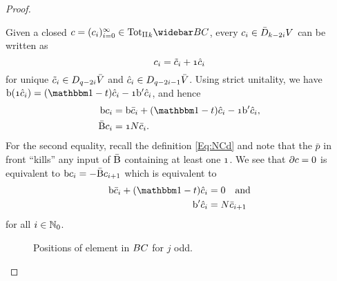 \documentclass[\MainFolder/Text.tex]{subfiles}
\begin{document}
\begin{proof}
\begin{ProofList}
Given a closed $c = (c_i)_{i=0}^\infty \in \TotII_k \NConCycBi$, every $c_i \in \bar{D}_{k-2i} V$ can be written as 
$$ c_i = \tilde{c}_i + \NOne \hat{c}_i $$
for unique $\tilde{c}_i\in D_{q-2i} \bar{V}$ and $\hat{c}_i \in D_{q-2i-1} \bar{V}$. Using strict unitality, we have $\Hd(\NOne\hat{c}_i) = (\Id-\CycPermOp)\hat{c}_i - \NOne \Hd'\hat{c}_i$, and hence
\begin{align*}
   \Hd c_i &=  \Hd\bar{c}_i + (\Id-\CycPermOp)\hat{c}_i - \NOne \Hd'\hat{c}_i, \\
   \NCd c_i &= \NOne \CountOp \bar{c}_i.
\end{align*}
For the second equality, recall the definition \eqref{Eq:NCd} and note that the $\bar{p}$ in front ``kills'' any input of $\bar{\mathrm{B}}$ containing at least one $\NOne$. We see that $\partial c = 0$ is equivalent to $\mathrm{b} c_i = - \bar{\mathrm{B}} c_{i+1}$ which is equivalent to
$$ \begin{aligned}
\Hd \bar{c}_i + (\Id-\CycPermOp)\hat{c}_i & = 0\quad\text{and}  \\
\Hd'\hat{c}_i &= \CountOp \bar{c}_{i+1}
\end{aligned} $$ 
for all $i\in \mathbb{N}_0$.
\begin{figure}
\centering
{}
\caption[Illustration of weight normalization in the Connes' bicomplex.]{Positions of element in $BC$ for $j$ odd.}
\label{Fig:PosOfElConCycBi}
\end{figure}


\end{ProofList}
\end{proof}
\end{document}
